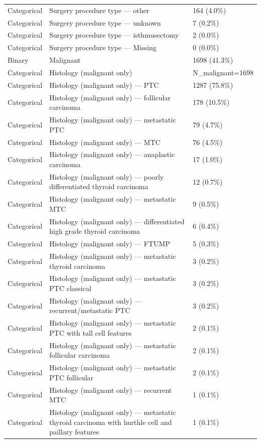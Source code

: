 \begin{table}[htbp]
\begin{tabular}{lll}
Categorical & Surgery procedure type — other & 164 (4.0\%) \\
Categorical & Surgery procedure type — unknown & 7 (0.2\%) \\
Categorical & Surgery procedure type — isthmusectomy & 2 (0.0\%) \\
Categorical & Surgery procedure type — Missing & 0 (0.0\%) \\
Binary & Malignant & 1698 (41.3\%) \\
Categorical & Histology (malignant only) & N\_malignant=1698 \\
Categorical & Histology (malignant only) — PTC & 1287 (75.8\%) \\
Categorical & Histology (malignant only) — follicular carcinoma & 178 (10.5\%) \\
Categorical & Histology (malignant only) — metastatic PTC & 79 (4.7\%) \\
Categorical & Histology (malignant only) — MTC & 76 (4.5\%) \\
Categorical & Histology (malignant only) — anaplastic carcinoma & 17 (1.0\%) \\
Categorical & Histology (malignant only) — poorly differentiated thyroid carcinoma & 12 (0.7\%) \\
Categorical & Histology (malignant only) — metastatic MTC & 9 (0.5\%) \\
Categorical & Histology (malignant only) — differentiated high grade thyroid carcinoma & 6 (0.4\%) \\
Categorical & Histology (malignant only) — FTUMP & 5 (0.3\%) \\
Categorical & Histology (malignant only) — metastatic thyroid carcinoma & 3 (0.2\%) \\
Categorical & Histology (malignant only) — metastatic PTC classical & 3 (0.2\%) \\
Categorical & Histology (malignant only) — recurrent/metastatic PTC & 3 (0.2\%) \\
Categorical & Histology (malignant only) — metastatic PTC with tall cell features & 2 (0.1\%) \\
Categorical & Histology (malignant only) — metastatic follicular carcinoma & 2 (0.1\%) \\
Categorical & Histology (malignant only) — metastatic PTC follicular & 2 (0.1\%) \\
Categorical & Histology (malignant only) — recurrent MTC & 1 (0.1\%) \\
Categorical & Histology (malignant only) — metastatic thyroid carcinoma with hurthle cell and paillary features & 1 (0.1\%) \\

\end{tabular}
\end{table}
